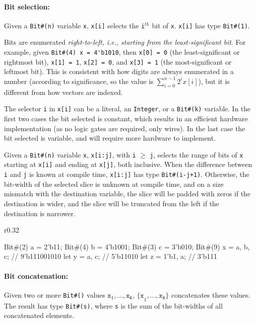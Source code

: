 \paragraph{Bit selection:}
Given a \verb|Bit#(n)| variable \verb|x|,
\verb|x[i]| selects the \verb|i|$^{th}$ bit of \verb|x|.
\verb|x[i]| has type \verb|Bit#(1)|.

Bits are enumerated \emph{right-to-left, i.e., starting from the least-significant bit}.
For example, given \verb|Bit#(4) x = 4'b1010|,
then \verb|x[0] = 0| (the least-significant or rightmost bit), 
\verb|x[1] = 1|, \verb|x[2] = 0|,
and \verb|x[3] = 1| (the most-significant or leftmost bit).
This is consistent with how digits are always enumerated in a number (according to significance, so the value is $\sum_{i=0}^{n-1}2^ix[i]$),
but it is different from how vectors are indexed.

The selector \verb|i| in \verb|x[i]| can be a literal, an \verb|Integer|, or a \verb|Bit#(k)| variable. In the first two cases the bit selected is constant,
which results in an efficient hardware implementation (as no logic gates are required, only wires).
In the last case the bit selected is variable, and will require more hardware to implement.

Given a \verb|Bit#(n)| variable \verb|x|,
\verb|x[i:j]|, with \verb|i| $\geq$ \verb|j|, selects the range of bits of \verb|x|
starting at \verb|x[i]| and ending at \verb|x[j]|, both inclusive.
When the difference between \verb|i| and \verb|j| is known at compile time,
\verb|x[i:j]| has type \verb|Bit#(i-j+1)|.
Otherwise, the bit-width of the selected slice is unknown at compile time,
and on a size mismatch with the destination variable,
the slice will be padded with zeros if the destination is wider,
and the slice will be truncated from the left if the destination is narrower.


\begin{wrapfigure}{r}{0.32\columnwidth}
\vspace{-1em}
\begin{mscode}
Bit#(2) a = 2'b11;
Bit#(4) b = 4'b1001;
Bit#(3) c = 3'b010;
Bit#(9) x = 
  {a, b, c};  // 9'b111001010
let y = {a, c};   // 5'b11010
let z = {1'b1, a};  // 3'b111
\end{mscode}
\vspace{-2.5em}
\end{wrapfigure}

\paragraph{Bit concatenation:}
Given two or more \verb|Bit#()| values $\texttt{x}_\texttt{1},...,\texttt{x}_\texttt{k}$,
$\texttt{\{x}_\texttt{1},...,\texttt{x}_\texttt{k}\texttt{\}}$ concatenates these values. The result has type \verb|Bit#(s)|, where \verb|s| is the sum of the bit-widths of all concatenated elements.

